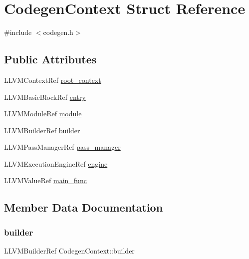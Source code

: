 \hypertarget{structCodegenContext}{}\section{Codegen\+Context Struct Reference}
\label{structCodegenContext}


{\ttfamily \#include $<$codegen.\+h$>$}

\subsection*{Public Attributes}
\begin{DoxyCompactItemize}
\item 
L\+L\+V\+M\+Context\+Ref \hyperlink{structCodegenContext_afae1864ec9a3561f4461d072c255700c}{root\+\_\+context}
\item 
L\+L\+V\+M\+Basic\+Block\+Ref \hyperlink{structCodegenContext_ad125dcf377ccf9bb51c76ad5f7ea4893}{entry}
\item 
L\+L\+V\+M\+Module\+Ref \hyperlink{structCodegenContext_aceee13ba95887eb4091ebcf212d1185b}{module}
\item 
L\+L\+V\+M\+Builder\+Ref \hyperlink{structCodegenContext_a72da26aa14b5f82f9a7a600168b9fc68}{builder}
\item 
L\+L\+V\+M\+Pass\+Manager\+Ref \hyperlink{structCodegenContext_ad4ea79e948ba98ef14cca2b05d9b23f9}{pass\+\_\+manager}
\item 
L\+L\+V\+M\+Execution\+Engine\+Ref \hyperlink{structCodegenContext_a4625384998aaebea963f363cd65280f4}{engine}
\item 
L\+L\+V\+M\+Value\+Ref \hyperlink{structCodegenContext_ae1f620a3a813e81a22cc680c1230dbbe}{main\+\_\+func}
\end{DoxyCompactItemize}


\subsection{Member Data Documentation}
\hypertarget{structCodegenContext_a72da26aa14b5f82f9a7a600168b9fc68}{}\label{structCodegenContext_a72da26aa14b5f82f9a7a600168b9fc68} 
\subsubsection{\texorpdfstring{builder}{builder}}
{\footnotesize\ttfamily L\+L\+V\+M\+Builder\+Ref Codegen\+Context\+::builder}

